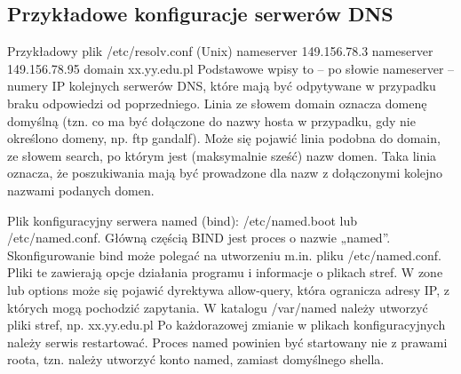 \documentclass[../main.tex]{subfiles}
\begin{document}
    \subsection{Przykładowe konfiguracje serwerów DNS}
    Przykładowy plik /etc/resolv.conf (Unix)
    nameserver 149.156.78.3
    nameserver 149.156.78.95
    domain xx.yy.edu.pl
    Podstawowe wpisy to – po słowie nameserver – numery IP kolejnych serwerów DNS, które
    mają być odpytywane w przypadku braku odpowiedzi od poprzedniego.
    Linia ze słowem domain oznacza domenę domyślną (tzn. co ma być dołączone do nazwy
    hosta w przypadku, gdy nie określono domeny, np. ftp gandalf).
    Może się pojawić linia podobna do domain, ze słowem search, po którym jest (maksymalnie
    sześć) nazw domen. Taka linia oznacza, że poszukiwania mają być prowadzone dla nazw z
    dołączonymi kolejno nazwami podanych domen.


    Plik konfiguracyjny serwera named (bind): /etc/named.boot lub /etc/named.conf.
    Główną częścią BIND jest proces o nazwie „named”.
    Skonfigurowanie bind może polegać na utworzeniu m.in. pliku /etc/named.conf. Pliki te zawierają opcje działania programu i informacje o plikach
    stref.
    W zone lub options może się pojawić dyrektywa allow-query,
    która ogranicza adresy IP, z których mogą pochodzić zapytania.
    W katalogu /var/named należy utworzyć pliki stref, np. xx.yy.edu.pl
    Po każdorazowej zmianie w plikach konfiguracyjnych należy serwis restartować.
    Proces named powinien być startowany nie z prawami roota, tzn. należy utworzyć konto
    named, zamiast domyślnego shella.
\end{document}
